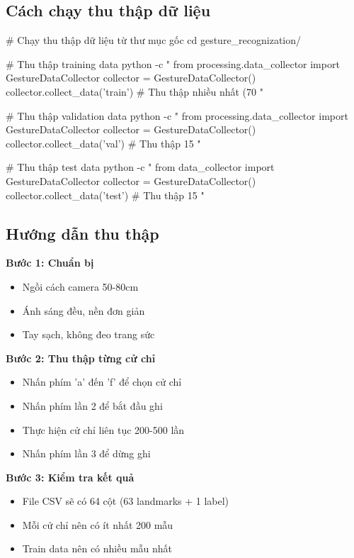 \subsection{Cách chạy thu thập dữ liệu}

\begin{aivncodebox}
\begin{python}
# Chạy thu thập dữ liệu từ thư mục gốc
cd gesture_recognization/

# Thu thập training data
python -c "
from processing.data_collector import GestureDataCollector
collector = GestureDataCollector()
collector.collect_data('train')  # Thu thập nhiều nhất (70%
"

# Thu thập validation data  
python -c "
from processing.data_collector import GestureDataCollector
collector = GestureDataCollector()
collector.collect_data('val')    # Thu thập 15%
"

# Thu thập test data
python -c "
from data_collector import GestureDataCollector
collector = GestureDataCollector()
collector.collect_data('test')   # Thu thập 15%
"
\end{python}
\end{aivncodebox}

\subsection{Hướng dẫn thu thập}

\textbf{Bước 1: Chuẩn bị}
\begin{itemize}
    \item Ngồi cách camera 50-80cm
    \item Ánh sáng đều, nền đơn giản
    \item Tay sạch, không đeo trang sức
\end{itemize}

\textbf{Bước 2: Thu thập từng cử chỉ}
\begin{itemize}
    \item Nhấn phím 'a' đến 'f' để chọn cử chỉ
    \item Nhấn phím lần 2 để bắt đầu ghi
    \item Thực hiện cử chỉ liên tục 200-500 lần
    \item Nhấn phím lần 3 để dừng ghi
\end{itemize}

\textbf{Bước 3: Kiểm tra kết quả}
\begin{itemize}
    \item File CSV sẽ có 64 cột (63 landmarks + 1 label)
    \item Mỗi cử chỉ nên có ít nhất 200 mẫu
    \item Train data nên có nhiều mẫu nhất
\end{itemize}

